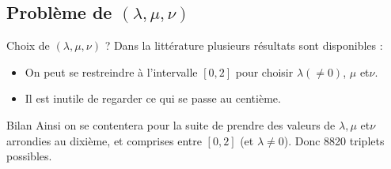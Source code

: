 \documentclass{beamer}
\begin{document}
\subsection{Problème de $(\lambda,\mu,\nu)$}

\begin{frame}{Choix de $(\lambda,\mu,\nu)$ ?}
Dans la littérature plusieurs résultats sont disponibles :
\begin{itemize}
\item On peut se restreindre à l'intervalle $[0,2]$ pour choisir $\lambda (\neq 0)$, $\mu$ et$ \nu$.
\item Il est inutile de regarder ce qui se passe au centième.
\end{itemize}

\begin{exampleblock}{Bilan}
Ainsi on se contentera pour la suite de prendre des valeurs de $\lambda, \mu$ et$ \nu$ arrondies au dixième, et comprises entre $[0,2]$ (et $\lambda \neq 0$). Donc 8820 triplets possibles.
\end{exampleblock}

\end{frame}
\end{document}
